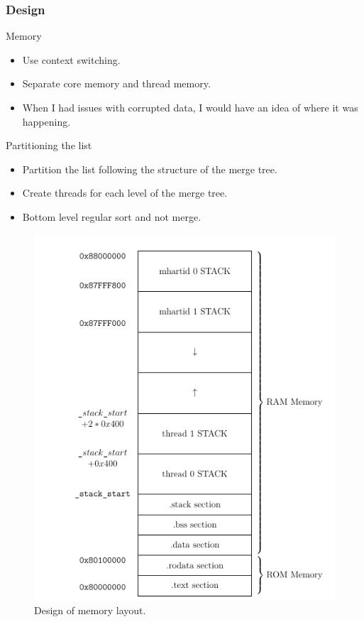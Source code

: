 \begin{frame}[hoved]
	\frametitle{Design}
	\begin{minipage}[t]{0.45\textwidth}
		{\large Memory}
		\begin{itemize}
			\item Use context switching.
			\item Separate core memory and thread memory.
			\item When I had issues with corrupted data, I would have an idea of where
			      it was happening.
		\end{itemize}
		{\large Partitioning the list}
		\begin{itemize}
			\item Partition the list following the structure of the merge tree.
			\item Create threads for each level of the merge tree.
			\item Bottom level regular sort and not merge.
		\end{itemize}
	\end{minipage}
	\hfill
	\begin{minipage}[t]{0.45\textwidth}
		\begin{figure}
			\begin{center}
				\includegraphics[height=0.65\textheight]{figures/memory.png}
			\end{center}
			\caption{Design of memory layout.}\label{fig:mem_layout}
		\end{figure}
	\end{minipage}
\end{frame}
